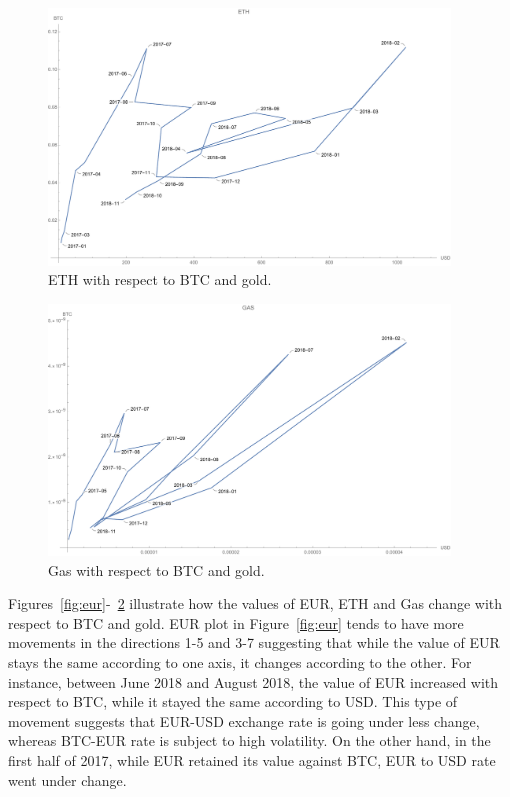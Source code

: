 \begin{figure}[!htb]
	\centering
	\includegraphics[width=0.95\textwidth]{figures/eth.pdf}
	\caption{\label{fig:eth} ETH with respect to BTC and gold.}
\end{figure}

\begin{figure}[!htb]
	\centering
	\includegraphics[width=0.95\textwidth]{figures/gas.pdf}
	\caption{\label{fig:gas} Gas with respect to BTC and gold.}
\end{figure}


Figures~\ref{fig:eur}-~\ref{fig:gas} illustrate how the values of EUR, ETH and Gas change with respect to BTC and gold. EUR plot in Figure~\ref{fig:eur} tends to have more movements in the directions 1-5 and 3-7 suggesting that while the value of EUR stays the same according to one axis, it changes according to the other. For instance, between June 2018 and August 2018, the value of EUR increased with respect to BTC, while it stayed the same according to USD. This type of movement suggests that EUR-USD exchange rate is going under less change, whereas BTC-EUR rate is subject to high volatility. On the other hand, in the first half of 2017, while EUR retained its value against BTC, EUR to USD rate went under change.

